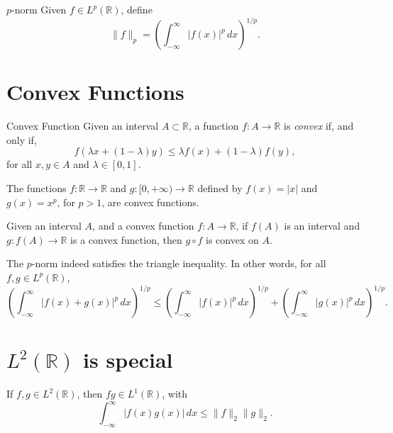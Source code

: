 
\begin{defn}{\(p\)-norm}{}
	Given \(f \in L^p(\mathbb{R})\), define \[
		\|f\|_p = \left( \int_{-\infty}^\infty |f(x)|^p\,dx \right)^{1/p}.
	\] 
\end{defn}

\section{Convex Functions}

\begin{defn}{Convex Function}{}
	Given an interval \(A \subset \mathbb{R}\), a function \(f \colon A \to \mathbb{R}\) is \emph{convex} if, and only if, \[
		f(\lambda x + (1 - \lambda) y) \leq \lambda f(x) + (1-\lambda) f(y),
	\] 
	for all \(x, y \in A\) and \(\lambda \in [0, 1]\).
\end{defn}

\begin{exmp}{}{}
	The functions \(f\colon \mathbb{R} \to \mathbb{R}\) and \(g \colon [0, +\infty) \to \mathbb{R}\) defined by \(f(x) = |x|\) and \(g(x) = x^p\), for \(p > 1\), are convex functions.
\end{exmp}

\begin{thm}{}{}
	Given an interval \(A\), and a convex function \(f \colon A \to \mathbb{R}\), if \(f(A)\) is an interval and \(g \colon f(A) \to \mathbb{R}\) is a convex function, then \(g \circ f\) is convex on \(A\).
\end{thm}

\begin{prop}{}{}
	The \(p\)-norm indeed satisfies the triangle inequality. In other words, for all \(f, g \in L^p(\mathbb{R})\), \[
		\left( \int_{-\infty}^\infty |f(x) + g(x)|^p\,dx \right)^{1/p} \leq
		\left( \int_{-\infty}^\infty |f(x)|^p\,dx \right)^{1/p} +
		\left( \int_{-\infty}^\infty |g(x)|^p\,dx \right)^{1/p}.
	\] 
\end{prop}

\section{\texorpdfstring{$L^2(\mathbb{R})$}{L\texttwosuperior(R)} is special}

\begin{thm}{}{}
	If \(f, g \in L^2(\mathbb{R})\), then \(fg \in L^1(\mathbb{R})\), with \[
		\int_{-\infty}^\infty |f(x)g(x)|\,dx
		\leq \|f\|_2 \|g\|_2.
	\] 
\end{thm}

